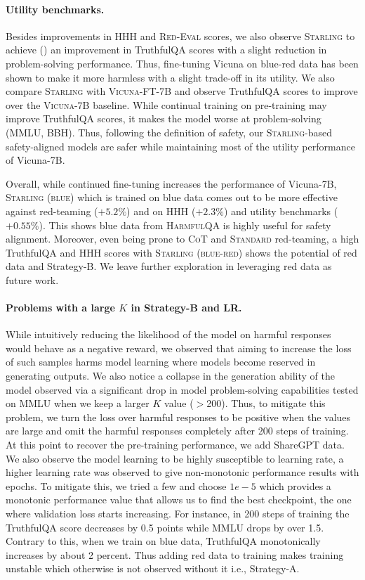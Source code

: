 \documentclass{article}
\newcommand{\starlingemoji}{\textsc{Starling}}
\newcommand{\dataset}{\textsc{HarmfulQA}}
\newcommand{\evaluation}{\textsc{Red-Eval}}
\begin{document}
{\paragraph{Utility benchmarks.} Besides improvements in HHH and \evaluation{} scores, we also observe \starlingemoji{} to achieve () an improvement in TruthfulQA scores with a slight reduction in problem-solving performance. Thus, fine-tuning Vicuna on blue-red data has been shown to make it more harmless with a slight trade-off in its utility. We also compare \starlingemoji{} with \textsc{Vicuna-FT-7B} and observe TruthfulQA scores to improve over the \textsc{Vicuna-7B} baseline. While continual training on pre-training may improve TruthfulQA scores, it makes the model worse at problem-solving (MMLU, BBH). Thus, following the definition of safety, our \starlingemoji{}-based safety-aligned models are safer while maintaining most of the utility performance of Vicuna-7B. 

Overall, while continued fine-tuning increases the performance of Vicuna-7B, \starlingemoji{} \textsc{(blue)} which is trained on blue data comes out to be more effective against red-teaming ($+5.2\%$) and on HHH ($+2.3\%$) and utility benchmarks ($+0.55\%$). This shows blue data from \dataset{} is highly useful for safety alignment. Moreover, even being prone to \textsc{CoT} and \textsc{Standard} red-teaming, a high TruthfulQA and HHH scores with \starlingemoji{} \textsc{(blue-red)} shows the potential of red data and Strategy-B. We leave further exploration in leveraging red data as future work.

\paragraph{Problems with a large $K$ in Strategy-B and LR.} While intuitively reducing the likelihood of the model on harmful responses would behave as a negative reward, we observed that aiming to increase the loss of such samples harms model learning where models become reserved in generating outputs. We also notice a collapse in the generation ability of the model observed via a significant drop in model problem-solving capabilities tested on MMLU when we keep a larger $K$ value ($>$200). Thus, to mitigate this problem, we turn the loss over harmful responses to be positive when the values are large and omit the harmful responses completely after 200 steps of training. At this point to recover the pre-training performance, we add ShareGPT data. We also observe the model learning to be highly susceptible to learning rate, a higher learning rate was observed to give non-monotonic performance results with epochs. To mitigate this, we tried a few and choose $1e-5$ which provides a monotonic performance value that allows us to find the best checkpoint, the one where validation loss starts increasing. For instance, in 200 steps of training the TruthfulQA score decreases by 0.5 points while MMLU drops by over 1.5. Contrary to this, when we train on blue data, TruthfulQA monotonically increases by about 2 percent. Thus adding red data to training makes training unstable which otherwise is not observed without it i.e., Strategy-A.






}
\end{document}
